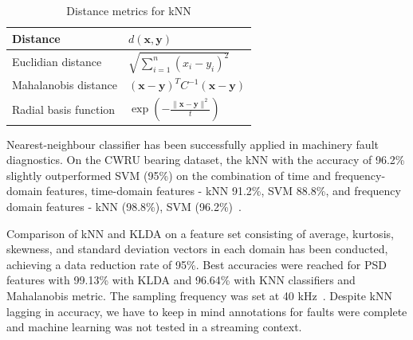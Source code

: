 \begin{table}[ht]
\centering
\renewcommand{\arraystretch}{2}
\begin{tabular}{|l|l|}
\hline
\textbf{Distance}     & \textbf{$d(\mathbf{x}, \mathbf{y})$}                                   \\ \hline
Euclidian distance    & $ \sqrt{\sum_{i = 1}^{n}(x_i - y_i)^2} $                               \\ \hline
Mahalanobis distance  & $ (\mathbf{x} - \mathbf{y})^T C^{-1} (\mathbf{x} - \mathbf{y}) $       \\ \hline
Radial basis function & $ \exp\left(-\frac{\lVert \mathbf{x} - \mathbf{y} \rVert^2}{t}\right) $ \\ \hline
\end{tabular}
\caption{Distance metrics for kNN}
\label{tab:knn-distance}
\end{table}

Nearest-neighbour classifier has been successfully applied in machinery fault diagnostics. On the CWRU bearing dataset, the kNN with the accuracy of 96.2\% slightly outperformed SVM (95\%) on the combination of time and frequency-domain features, time-domain features - kNN 91.2\%, SVM 88.8\%, and frequency domain features - kNN (98.8\%), SVM (96.2\%)~\cite{jamil_feature-based_2021}. 

Comparison of kNN and KLDA on a feature set consisting of average, kurtosis, skewness, and standard deviation vectors in each domain has been conducted, achieving a data reduction rate of 95\%. Best accuracies were reached for PSD features with 99.13\% with KLDA and 96.64\% with KNN classifiers and Mahalanobis metric. The sampling frequency was set at 40 kHz~\cite{altaf_new_2022}. Despite kNN lagging in accuracy, we have to keep in mind annotations for faults were complete and machine learning was not tested in a streaming context.
